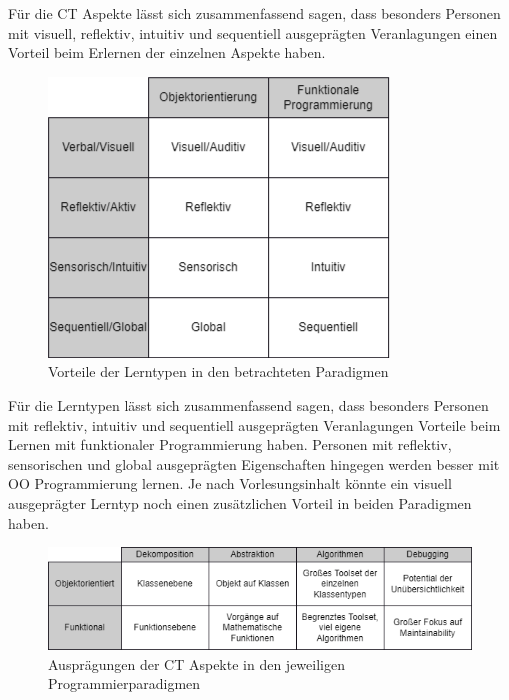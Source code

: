 Für die CT Aspekte lässt sich zusammenfassend sagen, dass besonders Personen mit visuell, reflektiv, intuitiv und sequentiell ausgeprägten Veranlagungen einen Vorteil beim Erlernen der einzelnen Aspekte haben.

\begin{figure}[H]
    \centering
    \includegraphics[width=1\linewidth]{Figures/Section_3/Styles_Paradigms}
    \caption{Vorteile der Lerntypen in den betrachteten Paradigmen}
\end{figure}

Für die Lerntypen lässt sich zusammenfassend sagen, dass besonders Personen mit reflektiv, intuitiv und sequentiell ausgeprägten Veranlagungen Vorteile beim Lernen mit funktionaler Programmierung haben.
Personen mit reflektiv, sensorischen und global ausgeprägten Eigenschaften hingegen werden besser mit OO Programmierung lernen.
Je nach Vorlesungsinhalt könnte ein visuell ausgeprägter Lerntyp noch einen zusätzlichen Vorteil in beiden Paradigmen haben.

\begin{figure}[H]
    \centering
    \includegraphics[width=1\linewidth]{Figures/Section_3/CT_Paradigms}
    \caption{Ausprägungen der CT Aspekte in den jeweiligen Programmierparadigmen}
\end{figure}

